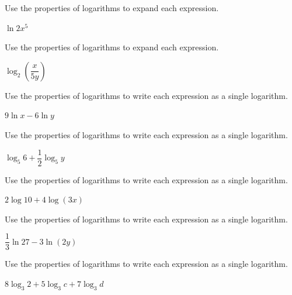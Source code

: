 \documentclass{article}
\newenvironment{practice}[2]{}{}        %
\newcommand{\answer}[1]{}               %
\begin{document}
\begin{practice}{16}{1}
Use the properties of logarithms to expand each expression.

$\ln 2x^5$

\answer{$\ln2+5\ln x$}
\end{practice}

\begin{practice}{17}{1}
Use the properties of logarithms to expand each expression.

$\log_2\left(\dfrac{x}{5y}\right)$

\answer{$\log_2 x-\log_2 5-\log_2 y$}
\end{practice}

\begin{practice}{18}{1}
Use the properties of logarithms to write each expression as a single logarithm.

$9\ln x-6\ln y$

\answer{$\ln\left(\dfrac{x^9}{y^6}\right)$}
\end{practice}

\begin{practice}{19}{1}
Use the properties of logarithms to write each expression as a single logarithm.

$\log_5 6+\dfrac{1}{2}\log_5 y$

\answer{$\log_5(6y^{1/2})$}
\end{practice}

\begin{practice}{20}{1}
Use the properties of logarithms to write each expression as a single logarithm.

$2\log10+4\log(3x)$

\answer{$\log(8100x^4)$}
\end{practice}

\begin{practice}{21}{1}
Use the properties of logarithms to write each expression as a single logarithm.

$\dfrac{1}{3}\ln27-3\ln(2y)$

\answer{$\ln\left(\dfrac{3}{8y^3}\right)$}
\end{practice}

\begin{practice}{22}{1}
Use the properties of logarithms to write each expression as a single logarithm.

$8\log_3 2+5\log_3 c+7\log_3 d$

\answer{$\log_3(256c^5d^7)$}
\end{practice}
\end{document}
